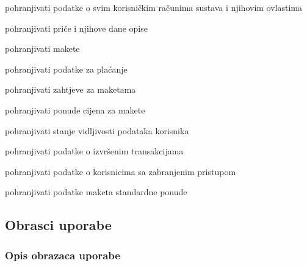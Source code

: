 \begin{packed_enum}
\begin{packed_enum}
			\end{packed_enum}
			

		
		\item  {}
		
		\begin{packed_enum}
			
			\item pohranjivati podatke o svim korisničkim računima sustava i njihovim ovlastima
			\item pohranjivati priče i njihove dane opise
			\item pohranjivati makete
			\item pohranjivati podatke za plaćanje
			\item pohranjivati zahtjeve za maketama
			\item pohranjivati ponude cijena za makete 
			\item pohranjivati stanje vidljivosti podataka korisnika
			\item pohranjivati podatke o izvršenim transakcijama
			\item pohranjivati podatke o korisnicima sa zabranjenim pristupom
			\item pohranjivati podatke maketa standardne ponude 
			
		\end{packed_enum}
		\end{packed_enum}
			
			\eject 
			
			
				
			\subsection{Obrasci uporabe}
				
				\subsubsection{Opis obrazaca uporabe}
							
